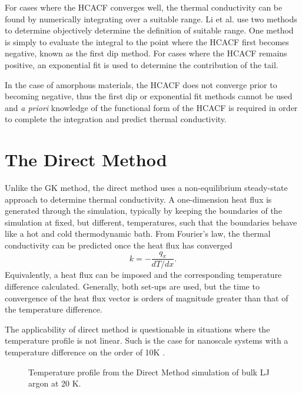 For cases where the HCACF converges well, the thermal conductivity can be found by numerically integrating over a suitable range. Li et al. \cite{Li1998139} use two methods to determine objectively determine the definition of suitable range. One method is simply to evaluate the integral to the point where the HCACF first becomes negative, known as the first dip method. For cases where the HCACF remains positive, an exponential fit is used to determine the contribution of the tail.

In the case of amorphous materials, the HCACF does not converge prior to becoming negative, thus the first dip or exponential fit methods cannot be used and \textit{a priori} knowledge of the functional form of the HCACF is required in order to complete the integration and predict thermal conductivity.

\section{The Direct Method}

Unlike the GK method, the direct method uses a non-equilibrium steady-state approach to determine thermal conductivity. A one-dimension heat flux is generated through the simulation, typically by keeping the boundaries of the simulation at fixed, but different, temperatures, such that the boundaries behave like a hot and cold thermodynamic bath. From Fourier's law, the thermal conductivity can be predicted once the heat flux has converged
%
\begin{equation}
k=-\frac{q_x}{dT/dx}.
\end{equation}
%
Equivalently, a heat flux can be imposed and the corresponding temperature difference calculated. Generally, both set-ups are used, but the time to convergence of the heat flux vector is orders of magnitude greater than that of the temperature difference.

The applicability of direct method is questionable in situations where the temperature profile is not linear. Such is the case for nanoscale systems with a temperature difference on the order of 10K \cite{mcgaugheythesis}.

\begin{figure}
\begin{center}
\renewcommand{\figure}{Fig.}
\caption{Temperature profile from the Direct Method simulation of bulk LJ argon at 20 K.}
\label{FIG:GK_bulk}
\end{center}
\end{figure}

